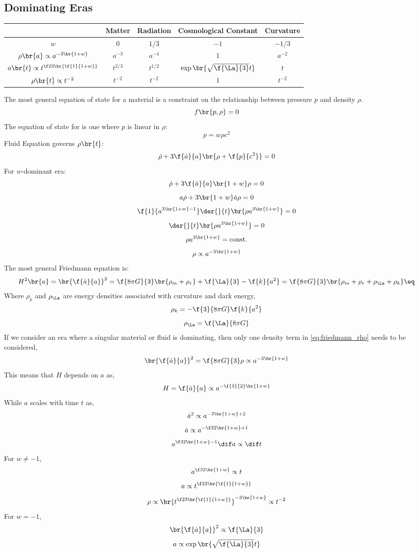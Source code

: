 \documentclass{article}
\begin{document}
\subsection{Dominating Eras}
\label{sec:dominating_eras}
\begin{center}
\begin{tabular}{|c|c|c|c|c|}
    \hline
     & Matter & Radiation & Cosmological Constant & Curvature \\
    \hline
    $w$ & $0$ & $1/3$ & $-1$ & $-1/3$ \\
    $\rho\br{a} \propto a^{-3\br{1 + w}}$ & $a^{-3}$ & $a^{-4}$ & $1$ & $a^{-2}$ \\
    $a\br{t} \propto t^{\f23\br{\f{1}{1 + w}}}$ & $t^{2/3}$ & $t^{1/2}$ & $\exp\br{\sqrt{\f{\La}{3}} t}$ & $t$ \\
    $\rho\br{t} \propto t^{-2}$ & $t^{-2}$ & $t^{-2}$ & $1$ & $t^{-2}$ \\
    \hline
\end{tabular}
\end{center}

The most general equation of state for a material is a constraint on the relationship between pressure $p$ and density $\rho$.
\[ f\br{p, \rho} = 0 \]
The equation of state for  is one where $p$ is linear in $\rho$:
\[ p = w\rho c^2 \]
Fluid Equation governs $\rho\br{t}$:
\[ \dot \rho + 3 \f{\dot a}{a} \br{\rho + \f{p}{c^2}} = 0 \]
For $w$-dominant era:
\[ \dot \rho + 3 \f{\dot a}{a} \br{1 + w}\rho = 0 \]
\[ a \dot \rho + 3\br{1 + w} \dot a \rho = 0 \]
\[ \f{1}{a^{3\br{1 + w} - 1}} \der{}{t}\br{\rho a^{3\br{1 + w}}} = 0 \]
\[ \der{}{t}\br{\rho a^{3\br{1 + w}}} = 0 \]
\[ \rho a^{3\br{1 + w}} = \text{const.} \]
\[ \rho \propto a^{-3\br{1 + w}} \]
The most general Friedmann equation is:
\[ H^2 \br{a} = \br{\f{\dot a}{a}}^2 = \f{8 \pi G}{3} \br{\rho_m + \rho_r} + \f{\La}{3} - \f{k}{a^2} = \f{8 \pi G}{3} \br{\rho_m + \rho_r + \rho_\La + \rho_k} \eq \label{eq:friedmann_rho}\]
Where $\rho_k$ and $\rho_\La$ are energy densities associated with curvature and dark energy,
\[ \rho_k = - \f{3}{8 \pi G} \f{k}{a^2} \]
\[ \rho_\La = \f{\La}{8 \pi G} \]
If we consider an era where a singular material or fluid is dominating, then only one density term in \cref{eq:friedmann_rho} needs to be considered,
\[ \br{\f{\dot a}{a}}^2 = \f{8 \pi G}{3} \rho \propto a^{-3\br{1 + w}} \]
This means that $H$ depends on $a$ as,
\[ H = \f{\dot a}{a} \propto a^{-\f{3}{2}\br{1 + w}} \]
While $a$ scales with time $t$ as,
\[ \dot a^2 \propto a^{-3\br{1 + w} +2} \]
\[ \dot a \propto a^{-\f32\br{1 + w} + 1} \]
\[ a^{\f32\br{1 + w} - 1} \dif a \propto \dif t  \]
For $w \neq -1$,
\[ a^{\f32\br{1 + w}} \propto t  \]
\[ a \propto t^{\f23\br{\f{1}{1 + w}}}  \]
\[ \rho \propto \br{t^{\f23\br{\f{1}{1 + w}}}}^{-3\br{1 + w}} \propto t^{-2} \]
For $w = -1$,
\[ \br{\f{\dot a}{a}}^2 \propto \f{\La}{3}  \]
\[ a \propto \exp\br{\sqrt{\f{\La}{3}} t} \]
\end{document}
